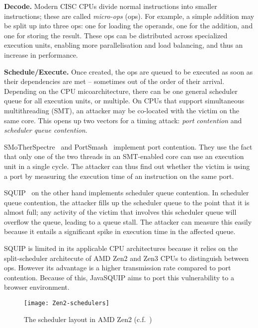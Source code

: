 \documentclass[11pt,
  titlepage=false,
]{scrreprt}
\begin{document}
\textbf{Decode.}
Modern CISC CPUs divide normal instructions into smaller instructions;
these are called \textit{micro-ops} (\textmu ops).
For example, a simple addition may be split up into three \textmu ops: one for loading the operands, one for the addition, and one for storing the result.
These \textmu ops can be distributed across specialized execution units, enabling more parallelisation and load balancing, and thus an increase in performance.

\textbf{Schedule/Execute.}
Once created, the \textmu ops are queued to be executed as soon as their dependencies are met -- sometimes out of the order of their arrival.
Depending on the CPU micoarchitecture, there can be one general scheduler queue for all execution units, or multiple.
On CPUs that support simultaneous multithreading (SMT), an attacker may be co-located with the victim on the same core.
This opens up two vectors for a timing attack: \textit{port contention} and \textit{scheduler queue contention}.

SMoTherSpectre~\cite{Bhattacharyya2019} and PortSmash~\cite{Aldaya2019port} implement port contention.
They use the fact that only one of the two threads in an SMT-enabled core can use an execution unit in a single cycle.
The attacker can thus find out whether the victim is using a port by measuring the execution time of an instruction on the same port.

SQUIP~\cite{squip} on the other hand implements scheduler queue contention.
In scheduler queue contention, the attacker fills up the scheduler queue to the point that it is almost full;
any activity of the victim that involves this scheduler queue will overflow the queue, leading to a queue stall.
The attacker can measure this easily because it entails a significant spike in execution time in the affected queue.

\clearpage
SQUIP is limited in its applicable CPU architectures because it relies on the split-scheduler architecute of AMD Zen2 and Zen3 CPUs to distinguish between \textmu ops.
However its advantage is a higher transmission rate compared to port contention.
Because of this, JavaSQUIP aims to port this vulnerability to a browser environment.

\begin{figure}
    \centering
    \texttt{[image: Zen2-schedulers]}

    \caption{The scheduler layout in AMD Zen2 (c.f.~\cite{squip})}
    \label{fig:amdzen2}
\end{figure}
\end{document}
